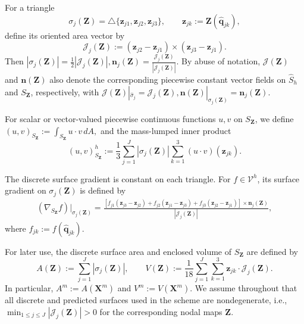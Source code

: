 \documentclass[smallextended]{svjour3}
\numberwithin{equation}{section}
\begin{document}
For a triangle
\[
\sigma_j(\mathbf Z)
=
\triangle\{\mathbf z_{j1},\mathbf z_{j2},\mathbf z_{j3}\},
\qquad
\mathbf z_{jk}:=\mathbf Z(\widehat{\mathbf q}_{jk}),
\]
define its oriented area vector by
\begin{equation}
	\mathcal J_j(\mathbf Z)
	:=
	(\mathbf z_{j2}-\mathbf z_{j1})
	\times
	(\mathbf z_{j3}-\mathbf z_{j1}).
	\label{eq:discrete-J-3d}
\end{equation}
Then
$
|\sigma_j(\mathbf Z)|
=
\frac12|\mathcal J_j(\mathbf Z)|,
\mathbf n_j(\mathbf Z)
=
\frac{\mathcal J_j(\mathbf Z)}
{|\mathcal J_j(\mathbf Z)|}.
$
By abuse of notation, $\mathcal J(\mathbf Z)$ and $\mathbf n(\mathbf Z)$ also denote the corresponding piecewise constant vector fields on $\widehat S_h$ and $S_{\mathbf Z}$, respectively, with
$
\mathcal J(\mathbf Z)|_{\widehat\sigma_j}
=
\mathcal J_j(\mathbf Z),
\mathbf n(\mathbf Z)|_{\sigma_j(\mathbf Z)}
=
\mathbf n_j(\mathbf Z).
$

For scalar or vector-valued piecewise continuous functions $u,v$ on $S_{\mathbf Z}$, we define
$
(u,v)_{S_{\mathbf Z}}
:=
\int_{S_{\mathbf Z}} u\cdot v\,dA,
$
and the mass-lumped inner product
\begin{equation}
	(u,v)^h_{S_{\mathbf Z}}
	:=
	\frac13
	\sum_{j=1}^J
	|\sigma_j(\mathbf Z)|
	\sum_{k=1}^3
	(u\cdot v)(\mathbf z_{jk}).
	\label{eq:mass-lumped-3d}
\end{equation}

The discrete surface gradient is constant on each triangle. For
$f\in\mathcal V^h$, its surface gradient on $\sigma_j(\mathbf Z)$ is defined by
\begin{equation}
	\begin{aligned}
		\left(\nabla_{S_{\mathbf Z}} f\right)|_{\sigma_j(\mathbf Z)}
		=
		\frac{
			\left[
			f_{j1}(\mathbf z_{j3}-\mathbf z_{j2})
			+f_{j2}(\mathbf z_{j1}-\mathbf z_{j3})
			+f_{j3}(\mathbf z_{j2}-\mathbf z_{j1})
			\right]
			\times \mathbf n_j(\mathbf Z)
		}
		{|\mathcal J_j(\mathbf Z)|},
	\end{aligned}
	\label{eq:surface-gradient-3d}
\end{equation}
where $f_{jk}:=f(\widehat{\mathbf q}_{jk})$.

For later use, the discrete surface area and enclosed volume of $S_{\mathbf Z}$ are
defined by
\begin{equation}
	A(\mathbf Z)
	:=
	\sum_{j=1}^J |\sigma_j(\mathbf Z)|,
	\qquad
	V(\mathbf Z)
	:=
	\frac{1}{18}
	\sum_{j=1}^J
	\sum_{k=1}^3
	\mathbf z_{jk}\cdot \mathcal J_j(\mathbf Z).
	\label{eq:discrete-area-volume-3d}
\end{equation}
In particular, $A^m:=A(\mathbf X^m)$ and $V^m:=V(\mathbf X^m)$. We assume throughout that all discrete and predicted surfaces used in the scheme are nondegenerate, i.e.,
$
\min_{1\le j\le J}|\mathcal J_j(\mathbf Z)|>0
$
for the corresponding nodal maps $\mathbf Z$.
\end{document}
